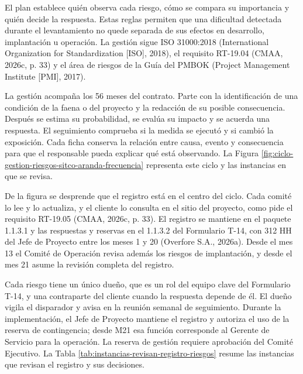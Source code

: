 \documentclass[subdoc]{../../comun/overfore}
\begin{document}
El plan establece quién observa cada riesgo, cómo se compara su importancia y quién decide la respuesta. Estas reglas permiten que una dificultad detectada durante el levantamiento no quede separada de sus efectos en desarrollo, implantación u operación. La gestión sigue ISO 31000:2018 (International Organization for Standardization [ISO], 2018), el requisito RT-19.04 (CMAA, 2026c, p. 33) y el área de riesgos de la Guía del PMBOK (Project Management Institute [PMI], 2017).

La gestión acompaña los 56 meses del contrato. Parte con la identificación de una condición de la faena o del proyecto y la redacción de su posible consecuencia. Después se estima su probabilidad, se evalúa su impacto y se acuerda una respuesta. El seguimiento comprueba si la medida se ejecutó y si cambió la exposición. Cada ficha conserva la relación entre causa, evento y consecuencia para que el responsable pueda explicar qué está observando. La Figura \ref{fig:ciclo-gestion-riesgos-sitco-aranda-frecuencia} representa este ciclo y las instancias en que se revisa.

De la figura se desprende que el registro está en el centro del ciclo. Cada comité lo lee y lo actualiza, y el cliente lo consulta en el sitio del proyecto, como pide el requisito RT-19.05 (CMAA, 2026c, p. 33). El registro se mantiene en el paquete 1.1.3.1 y las respuestas y reservas en el 1.1.3.2 del Formulario T-14, con 312 HH del Jefe de Proyecto entre los meses 1 y 20 (Overfore S.A., 2026a). Desde el mes 13 el Comité de Operación revisa además los riesgos de implantación, y desde el mes 21 asume la revisión completa del registro.

Cada riesgo tiene un único dueño, que es un rol del equipo clave del Formulario T-14, y una contraparte del cliente cuando la respuesta depende de él. El dueño vigila el disparador y avisa en la reunión semanal de seguimiento. Durante la implementación, el Jefe de Proyecto mantiene el registro y autoriza el uso de la reserva de contingencia; desde M21 esa función corresponde al Gerente de Servicio para la operación. La reserva de gestión requiere aprobación del Comité Ejecutivo. La Tabla \ref{tab:instancias-revisan-registro-riesgos} resume las instancias que revisan el registro y sus decisiones.
\end{document}
